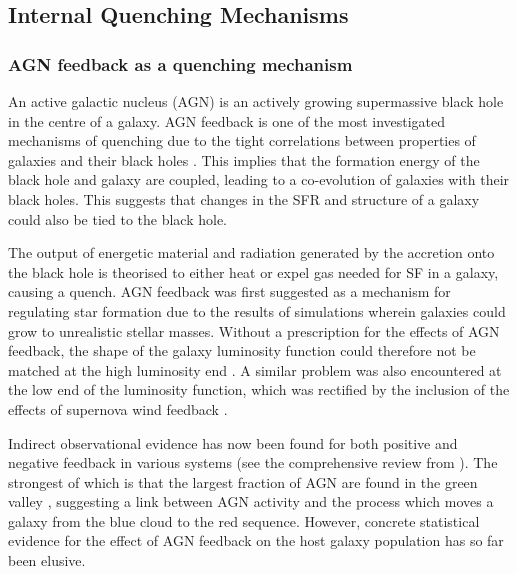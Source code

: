 \subsection{Internal Quenching Mechanisms}\label{sec:intquench}

\subsubsection{AGN feedback as a quenching mechanism}\label{sec:agnquench}

An active galactic nucleus (AGN) is an actively growing supermassive black hole in the centre of a galaxy. AGN feedback is one of the most investigated mechanisms of quenching due to the tight correlations between properties of galaxies and their black holes \citep{magorrian98, marconi03, haringrix04}. This implies that the formation energy of the black hole and galaxy are coupled, leading to a co-evolution of galaxies with their black holes. This suggests that changes in the SFR and structure of a galaxy could also be tied to the black hole. 

The output of energetic material and radiation generated by the accretion onto the black hole is theorised to either heat or expel gas needed for SF in a galaxy, causing a quench. AGN feedback was first suggested as a mechanism for regulating star formation due to the results of simulations \citep{silk98, Bower06, Croton06, somerville08} wherein galaxies could grow to unrealistic stellar masses. Without a prescription for the effects of AGN feedback, the shape of the galaxy luminosity function could therefore not be matched at the high luminosity end \citep{baugh98, baugh05, kauffmann99a, kauffmann99b, somerville01, kitzbichler06}. A similar problem was also encountered at the low end of the luminosity function, which was rectified by the inclusion of the effects of supernova wind feedback \citep{dekel86, powell11}.

Indirect observational evidence has now been found for both positive and negative feedback in various systems (see the comprehensive review from \citealt{fabian12}). The strongest of which is that the largest fraction of AGN are found in the green valley \citep{cowie08, Hickox09, schawinski10a}, suggesting a link between AGN activity and the process which moves a galaxy from the blue cloud to the red sequence. However, concrete statistical evidence for the effect of AGN feedback on the host galaxy population has so far been elusive.


